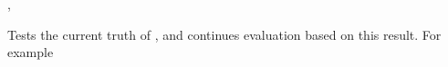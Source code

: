 \documentclass[oneside]{book}
\begin{document}
\begin{function}{\BoolIf,\BoolIfTF}
\begin{syntax}
 
   
\end{syntax}
Tests the current truth of , and continues evaluation
based on this result. For example
\begin{demohigh}
\BoolSetTrue\lTmpaBool
\BoolIfTF{}
\BoolSetFalse\lTmpaBool
\BoolIfTF{}
\end{demohigh}
\end{function}
\end{document}
